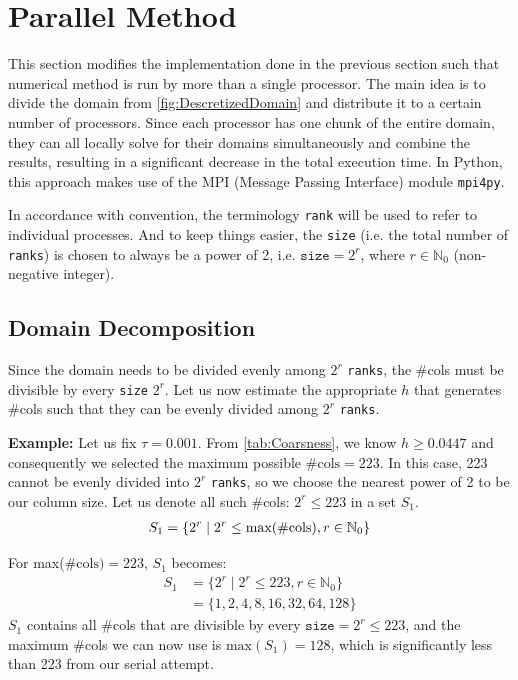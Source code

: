 \section{Parallel Method}
This section modifies the implementation done in the previous section such that numerical method is run by more than a single processor. The main idea is to divide the domain from \autoref{fig:DescretizedDomain} and distribute it to a certain number of processors. Since each processor has one chunk of the entire domain, they can all locally solve for their domains simultaneously and combine the results, resulting in a significant decrease in the total execution time. In Python, this approach makes use of the MPI (Message Passing Interface) module \texttt{mpi4py}.

In accordance with convention, the terminology \texttt{rank} will be used to refer to individual processes. And to keep things easier, the \texttt{size} (i.e. the total number of \texttt{ranks}) is chosen to always be a power of 2, i.e. $\texttt{size}= 2^r$, where $ r\in \mathbb{N}_{0}$ (non-negative integer).

\subsection{Domain Decomposition}
Since the domain needs to be divided evenly among $2^r$ \texttt{ranks}, the \#cols must be divisible by every \texttt{size} $2^r$. Let us now estimate the appropriate $h$ that generates \#cols such that they can be evenly divided among $2^r$ \texttt{ranks}.

\textbf{Example:} Let us fix  $\tau=0.001$. From \autoref{tab:Coarsness}, we know $h\geq0.0447$ and consequently we selected the maximum possible $\#\text{cols}=223$. In this case, 223 cannot be evenly divided into $2^r$ \texttt{ranks}, so we choose the nearest power of 2 to be our column size. Let us denote all such \#cols: $2^r \leq 223$ in a set $S_1$.
\begin{equation}
    \begin{aligned}
S_1 = \{2^r \mid 2^r \leq \text{max(\#\text{cols})}, r \in \mathbb{N}_{0} \}
    \end{aligned}
\end{equation}

For max($\#\text{cols})=223$, $S_1$ becomes:
\begin{equation}
    \begin{aligned}
        S_1 &= \{2^r \mid 2^r \leq 223, r \in \mathbb{N}_{0} \}  \\ 
        &= \{ 1,2,4,8,16,32,64,128 \} 
    \end{aligned}
    \label{eq:ddt31}
\end{equation}
$S_1$ contains all \#cols that are divisible by every $\texttt{size}=2^r\leq223$, and the maximum \#cols we can now use is $\text{max}(S_1) = 128$, which is significantly less than 223 from our serial attempt.

